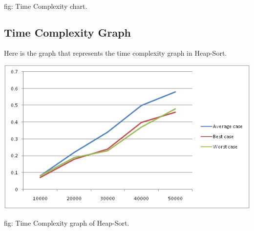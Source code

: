 \documentclass[12 pt,a4paper]{report}
\begin{document}
\hspace{5cm}fig: Time Complexity chart.

\subsection{Time Complexity Graph}

Here is the graph that represents the time complexity graph in Heap-Sort.

\vspace{1cm}

\includegraphics{heapsort.png}

\hspace{5cm}fig: Time Complexity graph of Heap-Sort.
\end{document}
